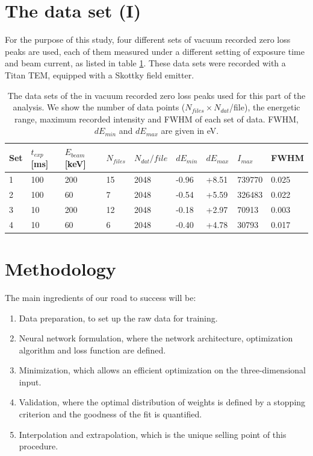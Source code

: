 \documentclass[11pt,a4paper]{article}
\numberwithin{equation}{section}
\numberwithin{figure}{section}
\numberwithin{table}{section}
\begin{document}
\section{The data set (I)}
For the purpose of this study, four different sets of vacuum recorded zero loss peaks are used, each of them measured under a different setting of exposure time and beam current, as listed in table \ref{table:vacuum}. These data sets were recorded with a Titan TEM, equipped with a Skottky field emitter.


\begin{table}[H]
\begin{tabular}{|l|l|l|l|l|l|l|l|l|}
\hline
Set & $t_{exp}$ {[}ms{]} & $E_{beam}$ {[}keV{]} & $N_{files}$ & $N_{dat} / file$ & $dE_{min}$  & $dE_{max}$  & $I_{max}$ & FWHM  \\ \hline
1        & 100                 & 200                  & 15          & 2048               & -0.96              & +8.51               & 739770       & 0.025         \\
2        & 100                 & 60                   & 7           & 2048               & -0.54              & +5.59               & 326483       & 0.022         \\
3        & 10                  & 200                  & 12          & 2048               & -0.18              & +2.97               & 70913        & 0.003         \\
4        & 10                  & 60                   & 6           & 2048               & -0.40              & +4.78               & 30793        & 0.017         \\ \hline
\end{tabular}

\caption{The data sets of the in vacuum recorded zero loss peaks used for this part of the analysis. We show the number of data points ($N_{files}\times N_{dat}$/file), the energetic range, maximum recorded intensity and FWHM of each set of data. FWHM, $dE_{min}$ and $dE_{max}$ are given in eV.}
\label{table:vacuum}
\end{table}

\section{Methodology}

The main ingredients of our road to success will be:
\begin{enumerate}
    \item Data preparation, to set up the raw data for training.
    \item Neural network formulation, where the network architecture, optimization algorithm and loss function are defined.
    \item Minimization, which allows an efficient optimization on the three-dimensional input.
    \item Validation, where the optimal distribution of weights is defined by a stopping criterion and the goodness of the fit is quantified. 
    \item Interpolation and extrapolation, which is the unique selling point of this procedure. 
\end{enumerate}
\end{document}
